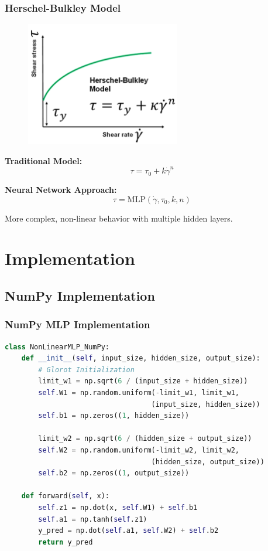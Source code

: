 \documentclass{beamer}
\begin{document}
\begin{frame}
\frametitle{Herschel-Bulkley Model}
\begin{figure}
\includegraphics[width=0.6\textwidth]{herschel-bulkley.png}
\end{figure}

\textbf{Traditional Model:}
\begin{equation}
\tau = \tau_0 + k \dot{\gamma}^n
\end{equation}

\textbf{Neural Network Approach:}
\begin{equation}
\tau = \text{MLP}(\dot{\gamma}, \tau_0, k, n)
\end{equation}

More complex, non-linear behavior with multiple hidden layers.
\end{frame}

\section{Implementation}

\subsection{NumPy Implementation}
\begin{frame}[fragile]
\frametitle{NumPy MLP Implementation}
\begin{lstlisting}[language=Python, basicstyle=\tiny]
class NonLinearMLP_NumPy:
    def __init__(self, input_size, hidden_size, output_size):
        # Glorot Initialization
        limit_w1 = np.sqrt(6 / (input_size + hidden_size))
        self.W1 = np.random.uniform(-limit_w1, limit_w1, 
                                   (input_size, hidden_size))
        self.b1 = np.zeros((1, hidden_size))
        
        limit_w2 = np.sqrt(6 / (hidden_size + output_size))
        self.W2 = np.random.uniform(-limit_w2, limit_w2, 
                                   (hidden_size, output_size))
        self.b2 = np.zeros((1, output_size))

    def forward(self, x):
        self.z1 = np.dot(x, self.W1) + self.b1
        self.a1 = np.tanh(self.z1)
        y_pred = np.dot(self.a1, self.W2) + self.b2
        return y_pred
\end{lstlisting}
\end{frame}
\end{document}
